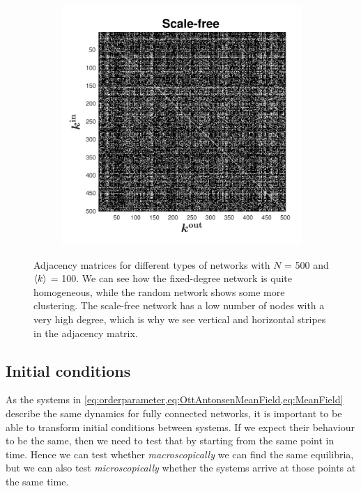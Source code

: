 \begin{figure}[ht]
\begin{subfigure}[b]{0.32\linewidth}
\end{subfigure} \hfill
\begin{subfigure}[b]{0.32\linewidth}
   \centering
  \includegraphics[width=\linewidth, trim={0.5cm 0.5cm 1cm 0.5cm },clip]{../Figures/Adjacency matrices/A_scalefree.pdf}
\end{subfigure}
   \caption{Adjacency matrices for different types of networks with $N$ = 500 and ${\langle k\rangle}$ = 100. We can see how the fixed-degree network is quite homogeneous, while the random network shows some more clustering. The scale-free network has a low number of nodes with a very high degree, which is why we see vertical and horizontal stripes in the adjacency matrix.}
   \label{fig:adjacencymatrices}
\end{figure}


\subsection{Initial conditions} \label{sec:initialconditions}
As the systems in \cref{eq:orderparameter,eq:OttAntonsenMeanField,eq:MeanField} describe the same dynamics for fully connected networks, it is important to be able to transform initial conditions between systems. If we expect their behaviour to be the same, then we need to test that by starting from the same point in time. Hence we can test whether \textsl{macroscopically} we can find the same equilibria, but we can also test \textsl{microscopically} whether the systems arrive at those points at the same time. 

